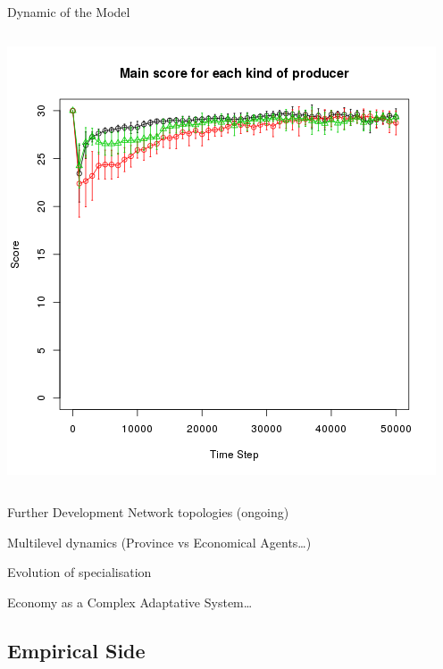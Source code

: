 \documentclass[8pt, handout=show,notes=show]{beamer}
\begin{document}
\begin{frame}{Dynamic of the Model}
\begin{columns}
		 \includegraphics[width=\textwidth]{images/scoreEx2.png}
	\end{columns}
	
\end{frame}

\begin{frame}{Further Development}
    Network topologies (ongoing)

    Multilevel dynamics (Province vs Economical Agents\ldots)
    
    Evolution of specialisation 

    Economy as a Complex Adaptative System\ldots
\end{frame}


\subsection{Empirical Side}
\end{document}

